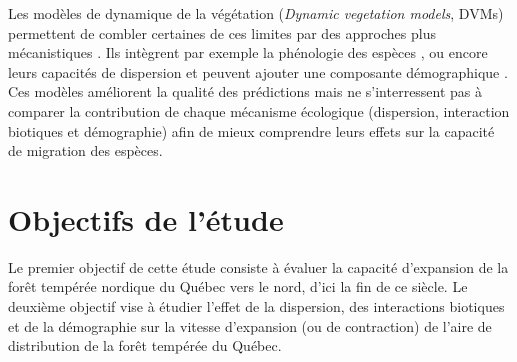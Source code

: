 
Les modèles de dynamique de la végétation
(\textit{Dynamic vegetation models}, DVMs) permettent de combler certaines de ces limites par des
approches plus mécanistiques \citep{Snell2014a}. Ils intègrent par exemple la phénologie des espèces
\citep{Letters2001,Morin2008}, ou encore leurs capacités de dispersion \citep{Nobis2014,Iverson2004}
et peuvent ajouter une composante démographique \citep{Lischke2006a,Vanderwel2014}. Ces
modèles améliorent la qualité des prédictions mais ne s'interressent pas à comparer la
contribution de chaque mécanisme écologique (dispersion, interaction biotiques et démographie) afin
de mieux comprendre leurs effets sur la capacité de migration des espèces.

\section*{Objectifs de l'étude}

Le premier objectif de cette étude consiste à évaluer la capacité d'expansion de la forêt tempérée nordique du Québec vers le nord, d'ici la fin de ce siècle. Le deuxième objectif vise à
étudier l'effet de la dispersion, des interactions biotiques et de la démographie sur la vitesse
d'expansion (ou de contraction) de l'aire de distribution de la forêt tempérée du Québec.

